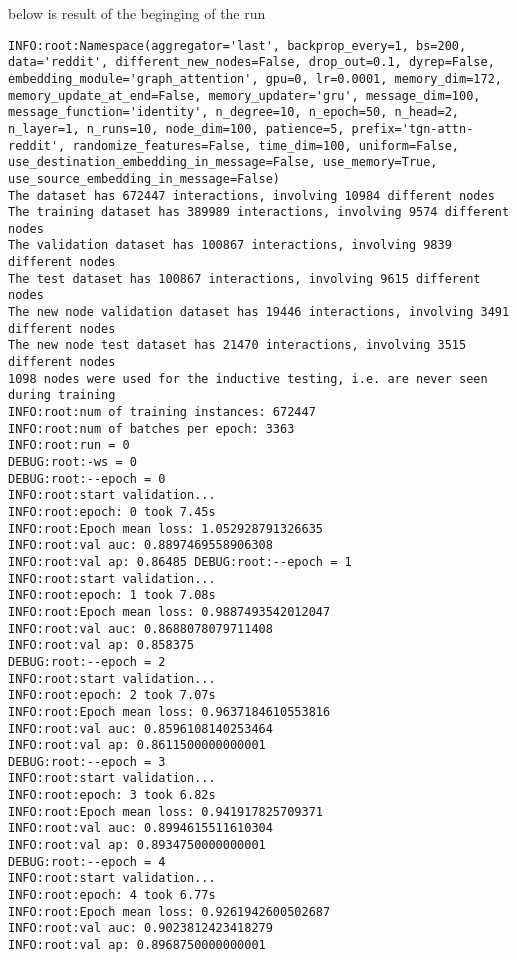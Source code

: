 \documentclass[11pt]{article}
\begin{document}
below is result of the beginging of the run
\begin{verbatim}
INFO:root:Namespace(aggregator='last', backprop_every=1, bs=200, data='reddit', different_new_nodes=False, drop_out=0.1, dyrep=False, embedding_module='graph_attention', gpu=0, lr=0.0001, memory_dim=172, memory_update_at_end=False, memory_updater='gru', message_dim=100, message_function='identity', n_degree=10, n_epoch=50, n_head=2, n_layer=1, n_runs=10, node_dim=100, patience=5, prefix='tgn-attn-reddit', randomize_features=False, time_dim=100, uniform=False, use_destination_embedding_in_message=False, use_memory=True, use_source_embedding_in_message=False)
The dataset has 672447 interactions, involving 10984 different nodes
The training dataset has 389989 interactions, involving 9574 different nodes
The validation dataset has 100867 interactions, involving 9839 different nodes
The test dataset has 100867 interactions, involving 9615 different nodes
The new node validation dataset has 19446 interactions, involving 3491 different nodes
The new node test dataset has 21470 interactions, involving 3515 different nodes
1098 nodes were used for the inductive testing, i.e. are never seen during training
INFO:root:num of training instances: 672447
INFO:root:num of batches per epoch: 3363
INFO:root:run = 0
DEBUG:root:-ws = 0
DEBUG:root:--epoch = 0
INFO:root:start validation...
INFO:root:epoch: 0 took 7.45s
INFO:root:Epoch mean loss: 1.052928791326635
INFO:root:val auc: 0.8897469558906308
INFO:root:val ap: 0.86485 DEBUG:root:--epoch = 1
INFO:root:start validation...
INFO:root:epoch: 1 took 7.08s
INFO:root:Epoch mean loss: 0.9887493542012047
INFO:root:val auc: 0.8688078079711408
INFO:root:val ap: 0.858375
DEBUG:root:--epoch = 2
INFO:root:start validation...
INFO:root:epoch: 2 took 7.07s
INFO:root:Epoch mean loss: 0.9637184610553816
INFO:root:val auc: 0.8596108140253464
INFO:root:val ap: 0.8611500000000001
DEBUG:root:--epoch = 3
INFO:root:start validation...
INFO:root:epoch: 3 took 6.82s
INFO:root:Epoch mean loss: 0.941917825709371
INFO:root:val auc: 0.8994615511610304
INFO:root:val ap: 0.8934750000000001
DEBUG:root:--epoch = 4
INFO:root:start validation...
INFO:root:epoch: 4 took 6.77s
INFO:root:Epoch mean loss: 0.9261942600502687
INFO:root:val auc: 0.9023812423418279
INFO:root:val ap: 0.8968750000000001
\end{verbatim}
\end{document}
